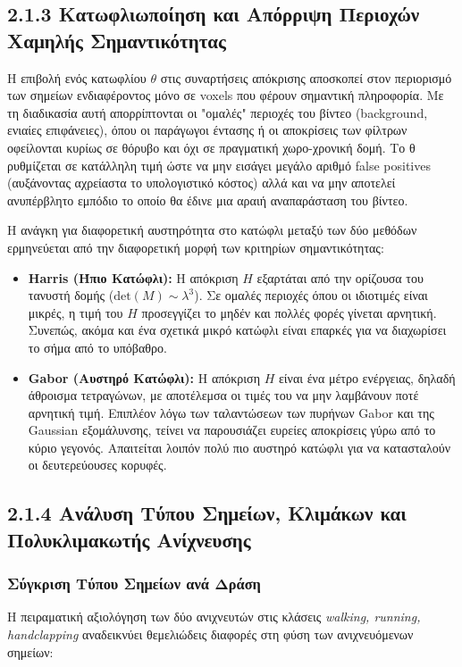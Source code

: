 \documentclass[12pt]{article}
\begin{document}
\subsection*{2.1.3 Κατωφλιωποίηση και Απόρριψη Περιοχών Χαμηλής Σημαντικότητας}

\hspace{0.6cm}Η επιβολή ενός κατωφλίου $\theta$ στις συναρτήσεις απόκρισης αποσκοπεί στον περιορισμό των σημείων ενδιαφέροντος μόνο σε voxels που φέρουν σημαντική πληροφορία. Με τη διαδικασία αυτή απορρίπτονται οι "ομαλές" περιοχές του βίντεο (background, ενιαίες επιφάνειες), όπου οι παράγωγοι έντασης ή οι αποκρίσεις των φίλτρων οφείλονται κυρίως σε θόρυβο και όχι σε πραγματική χωρο-χρονική δομή. Το θ ρυθμίζεται σε κατάλληλη τιμή ώστε να μην εισάγει μεγάλο αριθμό false positives (αυξάνοντας αχρείαστα το υπολογιστικό κόστος) αλλά και να μην αποτελεί ανυπέρβλητο εμπόδιο το οποίο θα έδινε μια αραιή αναπαράσταση του βίντεο.

Η ανάγκη για διαφορετική αυστηρότητα στο κατώφλι μεταξύ των δύο μεθόδων ερμηνεύεται από την διαφορετική μορφή των κριτηρίων σημαντικότητας:
\begin{itemize}
    \item \textbf{Harris (Ήπιο Κατώφλι):} Η απόκριση $H$ εξαρτάται από την ορίζουσα του τανυστή δομής ($\text{det}(M) \sim \lambda^3$). Σε ομαλές περιοχές όπου οι ιδιοτιμές είναι μικρές, η τιμή του $H$ προσεγγίζει το μηδέν και πολλές φορές γίνεται αρνητική. Συνεπώς, ακόμα και ένα σχετικά μικρό κατώφλι είναι επαρκές για να διαχωρίσει το σήμα από το υπόβαθρο.
    \item \textbf{Gabor (Αυστηρό Κατώφλι):} Η απόκριση $Η$ είναι ένα μέτρο ενέργειας, δηλαδή άθροισμα τετραγώνων, με αποτέλεμσα οι τιμές του να μην λαμβάνουν ποτέ αρνητική τιμή. Επιπλέον λόγω των ταλαντώσεων των πυρήνων Gabor και της Gaussian εξομάλυνσης, τείνει να παρουσιάζει ευρείες αποκρίσεις γύρω από το κύριο γεγονός. Απαιτείται λοιπόν πολύ πιο αυστηρό κατώφλι για να κατασταλούν οι δευτερεύουσες κορυφές.
\end{itemize}

\subsection*{2.1.4 Ανάλυση Τύπου Σημείων, Κλιμάκων και Πολυκλιμακωτής Ανίχνευσης}

\subsubsection*{Σύγκριση Τύπου Σημείων ανά Δράση}
Η πειραματική αξιολόγηση των δύο ανιχνευτών στις κλάσεις \textit{walking, running, handclapping} αναδεικνύει θεμελιώδεις διαφορές στη φύση των ανιχνευόμενων σημείων:
\end{document}
